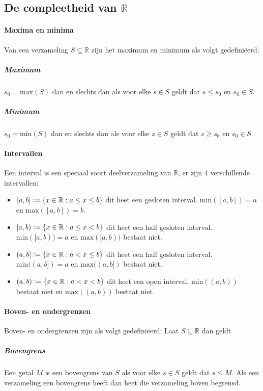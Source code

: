 \subsection{De compleetheid van \texorpdfstring{$\mathbb{R}$}{R}}

\paragraph{Maxima en minima} Van een verzameling $S\subseteq\mathbb{R}$ zijn het maximum en minimum als volgt gedefiniëerd:
\subparagraph{Maximum} $s_{0} = \text{max}(S)$ dan en slechts dan als voor elke $s \in S$ geldt dat $s \leq s_{0}$ en $s_{0} \in S$.
\subparagraph{Minimum}$s_{0} = \text{min}(S)$ dan en slechts dan als voor elke $s \in S$ geldt dat $s \geq s_{0}$ en $s_{0} \in S$.

\paragraph{Intervallen} Een interval is een speciaal soort deelverzameling van $\mathbb{R}$, er zijn 4 verschillende intervallen:
\begin{itemize}
    \setlength\itemsep{0em}
    \item $[a,b]\vcentcolon=\{x\in\mathbb{R}:a \leq x \leq b\}$ dit heet een gesloten interval. $\text{min}([a,b])=a$ en $\text{max}([a,b])=b$.
    \item $[a,b)\vcentcolon=\{x\in\mathbb{R}:a \leq x < b\}$ dit heet een half gesloten interval. $\text{min}([a,b))=a$ en $\text{max}([a,b))$ bestaat niet.
    \item $(a,b]\vcentcolon=\{x\in\mathbb{R}:a < x \leq b\}$ dit heet een half gesloten interval. $\text{min}((a,b])=a$ en $\text{max}((a,b])$ bestaat niet.
    \item $(a,b)\vcentcolon=\{x\in\mathbb{R}:a < x < b\}$ dit heet een open interval. $\text{min}((a,b))$ bestaat niet en $\text{max}((a,b))$ bestaat niet.
\end{itemize}

\paragraph{Boven- en ondergrenzen} Boven- en ondergrenzen zijn als volgt gedefiniëerd: Laat $S\subseteq\mathbb{R}$ dan geldt

\subparagraph{Bovengrens} Een getal $M$ is een bovengrens van $S$ als voor elke $s \in S$ geldt dat $s \leq M$. Als een verzameling een bovengrens heeft dan heet die verzameling boven begrensd.

